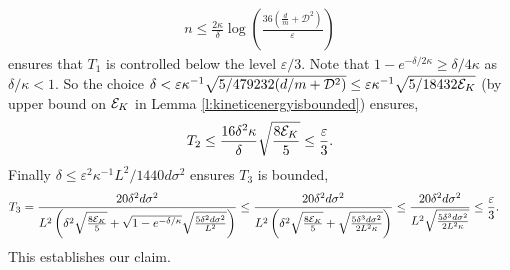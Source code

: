 \begin{Proof}
\begin{align*}
n \le \frac{2\kappa}{\delta}\log\left( \frac{36 \left(\frac{d}{m} + \mathcal{D}^2 \right)}{\varepsilon}\right)
\end{align*}
ensures that $T_1$ is controlled below the level $\varepsilon/3$. Note that $1-e^{-\delta/2\kappa} \ge \delta/4\kappa$ as $\delta/\kappa <1$. So the choice $\delta <\varepsilon \kappa^{-1}\sqrt{5/479232(d/m+\mathcal{D}^2)} \le \varepsilon\kappa^{-1}\sqrt{5/18432 \mathcal{E}_K}$ (by upper bound on $\mathcal{E}_K$ in Lemma \ref{l:kineticenergyisbounded}) ensures,
\begin{align*}
T_2  \le \frac{16\delta^2 \kappa}{\delta}\sqrt{\frac{8\mathcal{E}_K}{5}} \le \frac{\varepsilon}{3}.
\end{align*}
Finally $\delta \le \varepsilon^2\kappa^{-1}L^2/1440d\sigma^2$ ensures $T_3$ is bounded,
\begin{align*}
T_3  = \frac{20\delta^2d\sigma^2}{L^2\left(\delta^2 \sqrt{\frac{8\mathcal{E}_K}{5}} + \sqrt{1-e^{-\delta/\kappa}}\sqrt{\frac{5\delta^2d\sigma^2}{L^2}}\right)} & \le \frac{20\delta^2d\sigma^2}{L^2\left(\delta^2 \sqrt{\frac{8\mathcal{E}_K}{5}} + \sqrt{\frac{5\delta^3d\sigma^2}{2L^2\kappa}}\right)}  \le \frac{20\delta^2d\sigma^2}{L^2\sqrt{\frac{5\delta^3d\sigma^2}{2L^2\kappa}}} \le \frac{\varepsilon}{3}.
\end{align*}
This establishes our claim.


\end{Proof}
